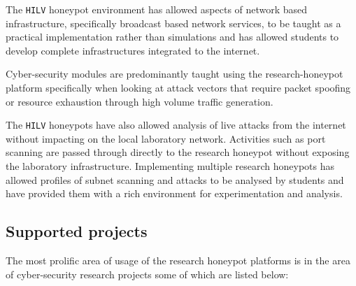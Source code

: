 The \texttt{HILV} honeypot environment has allowed aspects of network based
infrastructure, specifically broadcast based network services, to be taught as
a practical implementation rather than simulations and has allowed students to
develop complete infrastructures integrated to the internet.

Cyber-security modules are predominantly taught using the research-honeypot
platform specifically when looking at attack vectors that require packet
spoofing or resource exhaustion through high volume traffic generation.

The \texttt{HILV} honeypots have also allowed analysis of live attacks from the
internet without impacting on the local laboratory network. Activities such as
port scanning are passed through directly to the research honeypot without
exposing the laboratory infrastructure. Implementing multiple research
honeypots has allowed profiles of subnet scanning and attacks to be analysed by
students and have provided them with a rich environment for experimentation and
analysis.

\subsection{Supported projects}\label{Projects}

The most prolific area of usage of the research honeypot platforms is in the
area of cyber-security research projects some of which are listed below:

